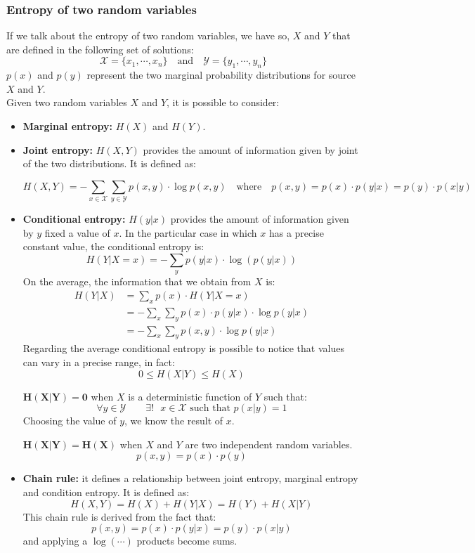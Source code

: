 \subsubsection{Entropy of two random variables} If we talk about the entropy of two random variables, we have so, $X$ and $Y$ that are defined in the following set of solutions:
$$\mathcal{X} = \{x_1, \cdots, x_n\} \quad \text{and} \quad \mathcal{Y} = \{y_1, \cdots, y_n\}$$
$p(x)$ and $p(y)$ represent the two marginal probability distributions for source $X$ and $Y$.\\
Given two random variables $X$ and $Y$, it is possible to consider:
\begin{itemize}
	\item \textbf{Marginal entropy:} $H(X)$ and $H(Y)$.
	\item \textbf{Joint entropy:} $H(X, Y)$ provides the amount of information given by joint of the two distributions. It is defined as:
	
	$$H(X,Y) = -\sum_{x \in \mathcal{X}} \sum_{y \in \mathcal{Y}} p(x,y) \cdot \log p(x,y) \quad \text{where} \quad p(x,y) = p(x) \cdot p(y|x) = p(y) \cdot p(x|y)$$
	
	\item \textbf{Conditional entropy:} $H(y|x)$ provides the amount of information given by $y$ fixed a value of $x$. In the particular case in which $x$ has a precise constant value, the conditional entropy is:
	$$H(Y|X=x) = - \sum_y p(y|x) \cdot \log(p(y|x))$$
	On the average, the information that we obtain from $X$ is:
	\begin{equation*}
	\begin{split}
	H(Y|X) &= \sum_x p(x) \cdot H(Y|X=x)\\
	&= - \sum_x \sum_y p(x) \cdot p(y|x) \cdot \log p(y|x)\\
	&= - \sum_x \sum_y p(x,y) \cdot \log p(y|x)		
	\end{split}
	\end{equation*}
	Regarding the average conditional entropy is possible to notice that values can vary in a precise range, in fact:
	$$0 \leq H(X|Y) \leq H(X)$$
	
	$\mathbf{H(X|Y) = 0}$ when $X$ is a deterministic function of $Y$ such that:
	$$\forall y \in \mathcal{Y} \qquad \exists!\text{ }x \in \mathcal{X} \text{ such that } p(x|y) = 1$$
	Choosing the value of $y$, we know the result of $x$. 
	
	$\mathbf{H(X|Y) = H(X)}$ when $X$ and $Y$ are two independent random variables.
	$$p(x,y) = p(x)\cdot p(y)$$
	\item \textbf{Chain rule:} it defines a relationship between joint entropy, marginal entropy and condition entropy. It is defined as:
	$$H(X,Y) = H(X) + H(Y|X) = H(Y) + H(X|Y)$$
	This chain rule is derived from the fact that:
	$$p(x,y) = p(x) \cdot p(y|x) = p(y) \cdot p(x|y)$$
	and applying a $\log(\cdots)$ products become sums. 
\end{itemize} 

